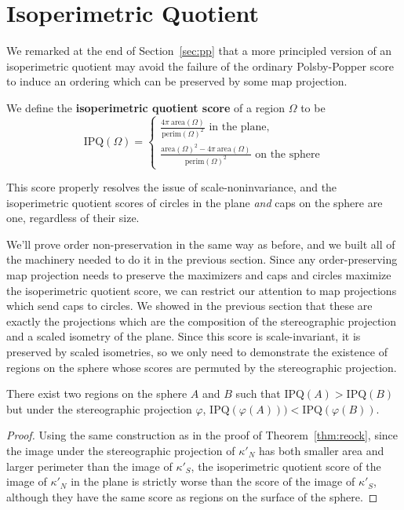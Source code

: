 \section{Isoperimetric Quotient}\label{sec:isoper}


We remarked at the end of Section~\ref{sec:pp} that a more principled version of an isoperimetric quotient may avoid the failure of the ordinary Polsby-Popper score to induce an ordering which can be preserved by some map projection.

\begin{definition}
We define the \textbf{isoperimetric quotient score} of a region $\Omega$ to be$$
\mathrm{IPQ}(\Omega)=
\begin{cases}
\frac{4\pi \ \mathrm{area}(\Omega)}{\mathrm{perim}(\Omega)^2} \text{ in the plane},\\[10pt]
\frac{\mathrm{area}(\Omega)^2 - 4\pi \ \mathrm{area}(\Omega)}{\mathrm{perim}(\Omega)^2}\text{ on the sphere}
\end{cases}
$$
\end{definition}

This score properly resolves the issue of scale-noninvariance, and the isoperimetric quotient scores of circles in the plane \textit{and} caps on the sphere are one, regardless of their size.

We'll prove order non-preservation in the same way as before, and we built all of the machinery needed to do it in the previous section.  Since any order-preserving map projection needs to preserve the maximizers and caps and circles maximize the isoperimetric quotient score, we can restrict our attention to map projections which send caps to circles.  We showed in the previous section that these are exactly the projections which are the composition of the stereographic projection and a scaled isometry of the plane.  Since this score is scale-invariant, it is preserved by scaled isometries, so we only need to demonstrate the existence of regions on the sphere whose scores are permuted by the stereographic projection.


\begin{theorem}
There exist two regions on the sphere $A$ and $B$ such that $\mathrm{IPQ}(A)>\mathrm{IPQ}(B)$ but under the stereographic projection $\varphi$, $\mathrm{IPQ}(\varphi(A)))<\mathrm{IPQ}(\varphi(B))$.
\end{theorem}



\begin{proof}
Using the same construction as in the proof of Theorem~\ref{thm:reock}, since the image under the stereographic projection of $\kappa'_N$ has both smaller area and larger perimeter than the image of $\kappa'_S$, the isoperimetric quotient score of the image of $\kappa'_N$ in the plane is strictly worse than the score of the image of $\kappa'_S$, although they have the same score as regions on the surface of the sphere.

\end{proof}


